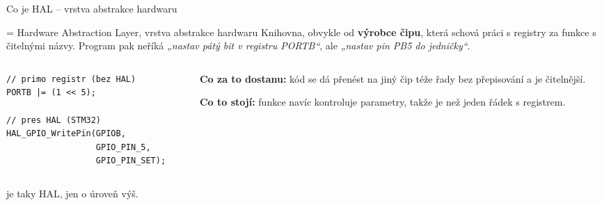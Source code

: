 \documentclass[12pt,aspectratio=169]{beamer}
\begin{document}
\begin{frame}[fragile]{Co je HAL -- vrstva abstrakce hardwaru}
  \begin{block}{ = Hardware Abstraction Layer, vrstva abstrakce hardwaru}
    \footnotesize
    Knihovna, obvykle od \textbf{výrobce čipu}, která schová práci s registry za
    funkce s čitelnými názvy. Program pak neříká \emph{„nastav pátý bit v registru
    PORTB``}, ale \emph{„nastav pin PB5 do jedničky``}.
  \end{block}
  \begin{columns}[T]
    \begin{column}{0.52\textwidth}
\begin{lstlisting}[style=arduino_bez_cisel]
// primo registr (bez HAL)
PORTB |= (1 << 5);

// pres HAL (STM32)
HAL_GPIO_WritePin(GPIOB,
                  GPIO_PIN_5,
                  GPIO_PIN_SET);
\end{lstlisting}
    \end{column}
    \begin{column}{0.44\textwidth}
      \footnotesize
      \textbf{Co za to dostanu:} kód se dá přenést na jiný čip téže řady bez
      přepisování a je čitelnější.

      \vspace{2mm}
      \textbf{Co to stojí:} funkce navíc kontroluje parametry, takže je
       než jeden řádek s registrem.
    \end{column}
  \end{columns}
  \scriptsize
    je taky HAL, jen o úroveň výš.
\end{frame}
\end{document}
